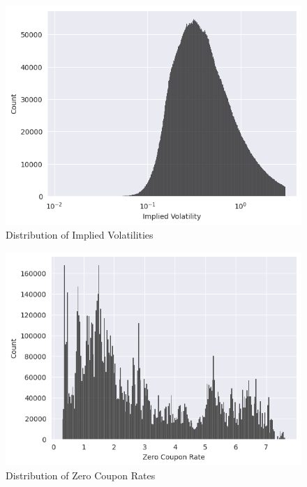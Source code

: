 \documentclass[a4paper]{article}
\begin{document}
\begin{multicols}{2}
  \begin{figure}[H]
    \centering
    \includegraphics[width=\linewidth]{03_imp_vol_dist.png}
    \caption{Distribution of Implied Volatilities}
    \label{fig:03_imp_vol_dist}
  \end{figure}
  
  \begin{figure}[H]
    \centering
    \includegraphics[width=\linewidth]{04_zero_coupon_dist.png}
    \caption{Distribution of Zero Coupon Rates}
    \label{fig:04_zero_coupon_dist}
  \end{figure}
\end{multicols}

\pagebreak
\end{document}
